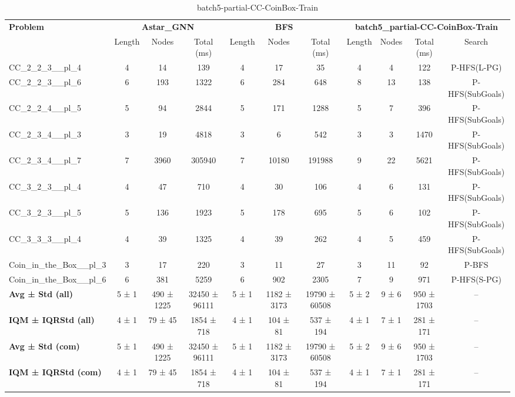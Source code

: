 \begin{table}[!ht]
\centering
\scriptsize
\begin{tabular}{l|ccc|ccc|cccc}
\multirow{2}{*}{\textbf{Problem}} & \multicolumn{3}{c|}{\textbf{Astar\_GNN}} & \multicolumn{3}{c|}{\textbf{BFS}} & \multicolumn{4}{c}{\textbf{batch5\_partial-CC-CoinBox-Train}} \\
\cline{2-11}
& Length & Nodes & Total (ms) & Length & Nodes & Total (ms) & Length & Nodes & Total (ms) & Search \\
\hline
CC\_2\_2\_3\_\_pl\_4 & 4 & 14 & 139 & 4 & 17 & 35 & 4 & 4 & 122 & P-HFS(L-PG) \\
CC\_2\_2\_3\_\_pl\_6 & 6 & 193 & 1322 & 6 & 284 & 648 & 8 & 13 & 138 & P-HFS(SubGoals) \\
CC\_2\_2\_4\_\_pl\_5 & 5 & 94 & 2844 & 5 & 171 & 1288 & 5 & 7 & 396 & P-HFS(SubGoals) \\
CC\_2\_3\_4\_\_pl\_3 & 3 & 19 & 4818 & 3 & 6 & 542 & 3 & 3 & 1470 & P-HFS(SubGoals) \\
CC\_2\_3\_4\_\_pl\_7 & 7 & 3960 & 305940 & 7 & 10180 & 191988 & 9 & 22 & 5621 & P-HFS(SubGoals) \\
CC\_3\_2\_3\_\_pl\_4 & 4 & 47 & 710 & 4 & 30 & 106 & 4 & 6 & 131 & P-HFS(SubGoals) \\
CC\_3\_2\_3\_\_pl\_5 & 5 & 136 & 1923 & 5 & 178 & 695 & 5 & 6 & 102 & P-HFS(SubGoals) \\
CC\_3\_3\_3\_\_pl\_4 & 4 & 39 & 1325 & 4 & 39 & 262 & 4 & 5 & 459 & P-HFS(SubGoals) \\
Coin\_in\_the\_Box\_\_pl\_3 & 3 & 17 & 220 & 3 & 11 & 27 & 3 & 11 & 92 & P-BFS \\
Coin\_in\_the\_Box\_\_pl\_6 & 6 & 381 & 5259 & 6 & 902 & 2305 & 7 & 9 & 971 & P-HFS(S-PG) \\
\hline
\textbf{Avg ± Std (all)} & 5 ± 1 & 490 ± 1225 & 32450 ± 96111 & 5 ± 1 & 1182 ± 3173 & 19790 ± 60508 & 5 ± 2 & 9 ± 6 & 950 ± 1703 & -- \\
\textbf{IQM ± IQRStd (all)} & 4 ± 1 & 79 ± 45 & 1854 ± 718 & 4 ± 1 & 104 ± 81 & 537 ± 194 & 4 ± 1 & 7 ± 1 & 281 ± 171 & -- \\
\textbf{Avg ± Std (com)} & 5 ± 1 & 490 ± 1225 & 32450 ± 96111 & 5 ± 1 & 1182 ± 3173 & 19790 ± 60508 & 5 ± 2 & 9 ± 6 & 950 ± 1703 & -- \\
\textbf{IQM ± IQRStd (com)} & 4 ± 1 & 79 ± 45 & 1854 ± 718 & 4 ± 1 & 104 ± 81 & 537 ± 194 & 4 ± 1 & 7 ± 1 & 281 ± 171 & -- \\
\end{tabular}
\caption{batch5-partial-CC-CoinBox-Train}
\label{tab:batch5_partial_CC-CoinBox_comparison_train}
\end{table}
